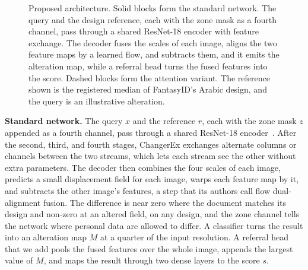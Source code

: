 \documentclass[12pt,a4paper]{article}
\begin{document}
\begin{figure}[htbp]
{}
\caption{Proposed architecture. Solid blocks form the standard network. The query and the design reference, each with the zone mask as a fourth channel, pass through a shared ResNet-18 encoder with feature exchange. The decoder fuses the scales of each image, aligns the two feature maps by a learned flow, and subtracts them, and it emits the alteration map, while a referral head turns the fused features into the score. Dashed blocks form the attention variant. The reference shown is the registered median of FantasyID's Arabic design, and the query is an illustrative alteration.}
\label{fig:arch}
\end{figure}

\textbf{Standard network.} The query $x$ and the reference $r$, each with the zone mask $z$ appended as a fourth channel, pass through a shared ResNet-18 encoder~\cite{he2016resnet}. After the second, third, and fourth stages, ChangerEx exchanges alternate columns or channels between the two streams, which lets each stream see the other without extra parameters. The decoder then combines the four scales of each image, predicts a small displacement field for each image, warps each feature map by it, and subtracts the other image's features, a step that its authors call flow dual-alignment fusion. The difference is near zero where the document matches its design and non-zero at an altered field, on any design, and the zone channel tells the network where personal data are allowed to differ. A classifier turns the result into an alteration map $M$ at a quarter of the input resolution. A referral head that we add pools the fused features over the whole image, appends the largest value of $M$, and maps the result through two dense layers to the score $s$.
\end{document}
